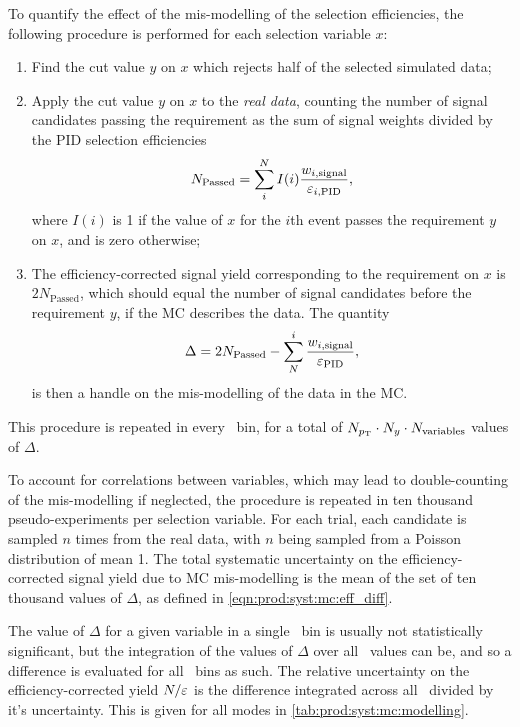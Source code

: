 To quantify the effect of the mis-modelling of the selection efficiencies, the 
following procedure is performed for each selection variable $x$:
\begin{enumerate}
  \item Find the cut value $y$ on $x$ which rejects half of the selected 
    simulated data;
  \item Apply the cut value $y$ on $x$ to the \emph{real data}, counting the 
    number of signal candidates passing the requirement as the sum of signal 
    weights divided by the \ac{PID} selection efficiencies
    \begin{equation}
      N_{\text{Passed}} = \sum_{i}^{N} I(i) \frac{%
        w_{i,\text{signal}}
      }{%
        \eff_{i,\text{PID}}
      },
    \end{equation}
    where $I(i)$ is 1 if the value of $x$ for the $i$th event passes the 
    requirement $y$ on $x$, and is zero otherwise;
  \item The efficiency-corrected signal yield corresponding to the requirement 
    on $x$ is $2N_{\text{Passed}}$, which should equal the number of signal 
    candidates before the requirement $y$, if the \ac{MC} describes the data.  
    The quantity
    \begin{equation}
      \Delta = 2N_{\text{Passed}} - \sum_{N}^{i} \frac{w_{i,\text{signal}}}{\varepsilon_{\textnormal{PID}}},
      \label{eqn:prod:syst:mc:eff_diff}
    \end{equation}
    is then a handle on the mis-modelling of the data in the \ac{MC}.
\end{enumerate}
This procedure is repeated in every \pTy\ bin, for a total of $N_{p_{\textnormal{T}}} \cdot 
N_{y} \cdot N_{\text{variables}}$ values of $\Delta$.

To account for correlations between variables, which may lead to 
double-counting of the mis-modelling if neglected, the procedure is repeated 
in ten thousand pseudo-experiments per selection variable.
For each trial, each candidate is sampled $n$ times from the real data, with 
$n$ being sampled from a Poisson distribution of mean 1.
The total systematic uncertainty on the efficiency-corrected signal yield due 
to \ac{MC} mis-modelling is the mean of the set of ten thousand values of $\Delta$, as defined in \cref{eqn:prod:syst:mc:eff_diff}.

The value of $\Delta$ for a given variable in a single \pTy\ bin is usually not 
statistically significant, but the integration of the values of $\Delta$ over 
all \pTy\ values can be, and so a difference is evaluated for all \pTy\ bins as 
such.
The relative uncertainty on the efficiency-corrected yield $N/\varepsilon$ is the 
difference integrated across all \pTy\ divided by it's uncertainty.
This is given for all modes in \cref{tab:prod:syst:mc:modelling}.

